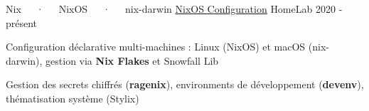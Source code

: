 

\begin{cventries}

	\cventry
	{Nix~~~·~~~NixOS~~~·~~~nix-darwin}
	{\href{https://gitlab.com/NicolasGuilloux/nixos-configuration}{NixOS Configuration}}
	{HomeLab}
	{2020 - présent}
	{
		\begin{cvitems} %
			\item {Configuration déclarative multi-machines : Linux (NixOS) et macOS (nix-darwin), gestion via \textbf{Nix Flakes} et Snowfall Lib}
			\item {Gestion des secrets chiffrés (\textbf{ragenix}), environments de développement (\textbf{devenv}), thématisation système (Stylix)}
		\end{cvitems}
	}

\end{cventries}
